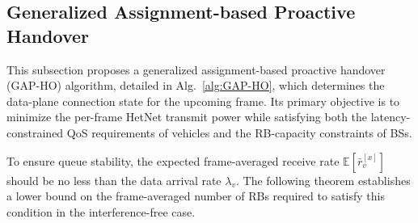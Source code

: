 \documentclass[conference, a4paper]{IEEEtran}
\theoremstyle{remark}
\begin{document}
\subsection{Generalized Assignment-based Proactive Handover}
\label{subsection:PHO strategy}

This subsection proposes a generalized assignment-based proactive handover (GAP-HO) algorithm, detailed in Alg.~\ref{alg:GAP-HO}, which determines the data-plane connection state for the upcoming frame. Its primary objective is to minimize the per-frame HetNet transmit power while satisfying both the latency-constrained QoS requirements of vehicles and the RB-capacity constraints of BSs.

To ensure queue stability, the expected frame-averaged receive rate $\mathbb{E}[\bar{r}_v^{[x]}]$ should be no less than the data arrival rate $\lambda_v$. The following theorem establishes a lower bound on the frame-averaged number of RBs required to satisfy this condition in the interference-free case.
\end{document}
